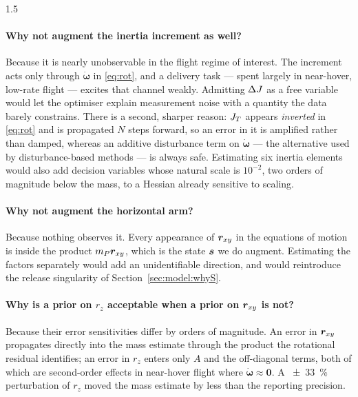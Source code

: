 \begin{spacing}{1.5}
\paragraph{Why not augment the inertia increment as well?} Because it is nearly
unobservable in the flight regime of interest. The increment acts only through
$\dot{\bm{\omega}}$ in \eqref{eq:rot}, and a delivery task --- spent largely in
near-hover, low-rate flight --- excites that channel weakly. Admitting $\Delta J$ as a
free variable would let the optimiser explain measurement noise with a quantity
the data barely constrains. There is a second, sharper reason: $J_T$ appears
\emph{inverted} in \eqref{eq:rot} and is propagated $N$ steps forward, so an
error in it is amplified rather than damped, whereas an additive disturbance
term on $\dot{\bm\omega}$ --- the alternative used by disturbance-based methods
\cite{hanover2021} --- is always safe. Estimating six inertia elements would also add
decision variables whose natural scale is $10^{-2}$, two orders of magnitude
below the mass, to a Hessian already sensitive to scaling.

\paragraph{Why not augment the horizontal arm?} Because nothing observes it.
Every appearance of $\bm{r}_{xy}$ in the equations of motion is inside the
product $m_P\bm{r}_{xy}$, which is the state $\bm{s}$ we do augment. Estimating
the factors separately would add an unidentifiable direction, and would
reintroduce the release singularity of Section~\ref{sec:model:whyS}.

\paragraph{Why is a prior on $r_z$ acceptable when a prior on $\bm{r}_{xy}$ is
not?} Because their error sensitivities differ by orders of magnitude. An error
in $\bm{r}_{xy}$ propagates directly into the mass estimate through the product
the rotational residual identifies; an error in $r_z$ enters only $A$ and the
off-diagonal terms, both of which are second-order effects in near-hover flight
where $\dot{\bm{\omega}}\approx\bm 0$. A \SI{\pm33}{\percent} perturbation of
$r_z$ moved the mass estimate by less than the reporting precision.


\end{spacing}
